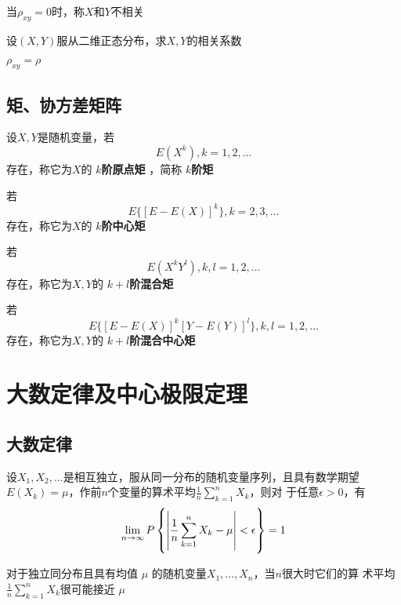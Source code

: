\documentclass[11pt]{article}
\begin{document}
当\(\rho_{xy}=0\)时，称\(X\)和\(Y\)不相关

\begin{examplle}[]
设\((X,Y)\)服从二维正态分布，求\(X,Y\)的相关系数

\(\rho_{xy}=\rho\)
\end{examplle}
\subsection{矩、协方差矩阵}
\label{sec:org62c3108}
\begin{definition}[]
设\(X,Y\)是随机变量，若
\begin{equation*}
E(X^k),k=1,2,\dots
\end{equation*}
存在，称它为\(X\)的 \textbf{\(k\)阶原点矩} ，简称 \textbf{\(k\)阶矩}

若
\begin{equation*}
E\{[E-E(X)]^k\},k=2,3,\dots
\end{equation*}
存在，称它为\(X\)的 \textbf{\(k\)阶中心矩}

若
\begin{equation*}
E(X^kY^l),k,l=1,2,\dots
\end{equation*}
存在，称它为\(X,Y\)的 \textbf{\(k+l\)阶混合矩}

若
\begin{equation*}
E\{[E-E(X)]^k[Y-E(Y)]^l\},k,l=1,2,\dots
\end{equation*}
存在，称它为\(X,Y\)的 \textbf{\(k+l\)阶混合中心矩}
\end{definition}
\section{大数定律及中心极限定理}
\label{sec:org40ac5a9}
\subsection{大数定律}
\label{sec:orgff5c057}
\begin{theorem}
设\(X_1,X_2,\dots\)是相互独立，服从同一分布的随机变量序列，且具有数学期望
\(E(X_k)=\mu\)，作前\(n\)个变量的算术平均\(\frac{1}{n}\sum_{k=1}^nX_k\)，则对
于任意\(\epsilon>0\)，有
\begin{equation*}
\lim_{n\to\infty}P\left\{
\abs{\frac{1}{n}\sum_{k=1}^nX_k-\mu}<\epsilon
\right\}=1
\end{equation*}
\end{theorem}

对于独立同分布且具有均值 \(\mu\) 的随机变量\(X_1,\dots,X_n\)，当\(n\)很大时它们的算
术平均\(\frac{1}{n}\sum_{k=1}^nX_k\)很可能接近 \(\mu\)
\end{document}
